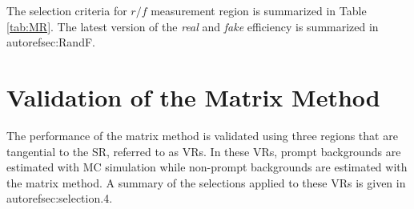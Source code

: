 The selection criteria for $r/f$ measurement region is summarized in Table \ref{tab:MR}. The latest version of the \emph{real} and \emph{fake} efficiency is summarized in autoref{sec:RandF}.

\begin{table}[th]
\sffamily
\centering
{}
\caption{Summary of the cuts applied to the $r$/$f$ measurement region.}
\label{tab:MR}
\end{table}
\section{Validation of the Matrix Method}
\label{sec:MMVR}

The performance of the matrix method is validated using three regions that are tangential to the SR, referred to as VRs. In these VRs, prompt backgrounds are estimated with MC simulation while non-prompt backgrounds are estimated with the matrix method. A summary of the selections applied to these VRs is given in autoref{sec:selection}.4. 

